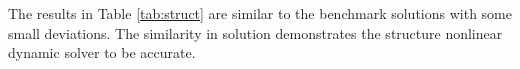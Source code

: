 \documentclass{article}
\begin{document}
The results in Table \ref{tab:struct} are similar to the benchmark solutions with some small deviations. The similarity in solution demonstrates the structure nonlinear dynamic solver to be accurate. 







{}

\end{document}
